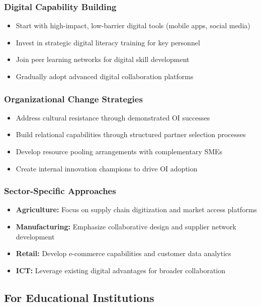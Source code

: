 \subsubsection{Digital Capability Building}
\begin{itemize}
    \item Start with high-impact, low-barrier digital tools (mobile apps, social media)
    \item Invest in strategic digital literacy training for key personnel
    \item Join peer learning networks for digital skill development
    \item Gradually adopt advanced digital collaboration platforms
\end{itemize}

\subsubsection{Organizational Change Strategies}
\begin{itemize}
    \item Address cultural resistance through demonstrated OI successes
    \item Build relational capabilities through structured partner selection processes
    \item Develop resource pooling arrangements with complementary SMEs
    \item Create internal innovation champions to drive OI adoption
\end{itemize}

\subsubsection{Sector-Specific Approaches}
\begin{itemize}
    \item \textbf{Agriculture:} Focus on supply chain digitization and market access platforms
    \item \textbf{Manufacturing:} Emphasize collaborative design and supplier network development
    \item \textbf{Retail:} Develop e-commerce capabilities and customer data analytics
    \item \textbf{ICT:} Leverage existing digital advantages for broader collaboration
\end{itemize}

\subsection{For Educational Institutions}

